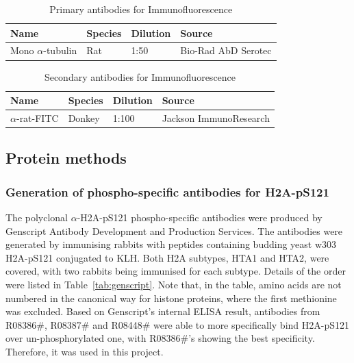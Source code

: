 \begin{table}[htbp]
\centering
\caption{Primary antibodies for Immunofluorescence}
\label{tab:1stabIF}
\begin{tabular}{llll}
\hline
\textbf{Name} & \textbf{Species} & \textbf{Dilution} & \textbf{Source} \\ \hline
Mono $\alpha$-tubulin & Rat & 1:50 & Bio-Rad AbD Serotec \\   
\end{tabular}
\end{table}

\begin{table}[htbp]
\centering
\caption{Secondary antibodies for Immunofluorescence}
\label{tab:2ndabIF}
\begin{tabular}{llll}
\hline
\textbf{Name} & \textbf{Species} & \textbf{Dilution} & \textbf{Source} \\ \hline
$\alpha$-rat-FITC & Donkey & 1:100 & Jackson ImmunoResearch \\   
\end{tabular}
\end{table}


\subsection{Protein methods}
\subsubsection{Generation of phospho-specific antibodies for H2A-pS121}

The polyclonal $\alpha$-H2A-pS121 phospho-specific antibodies were produced by Genscript Antibody Development and Production Services. The antibodies were generated by immunising rabbits with peptides containing budding yeast w303 H2A-pS121 conjugated to KLH. Both H2A subtypes, HTA1 and HTA2, were covered, with two rabbits being immunised for each subtype. Details of the order were listed in Table~\ref{tab:genscript}. Note that, in the table, amino acids are not numbered in the canonical way for histone proteins, where the first methionine was excluded. Based on Genscript's internal ELISA result, antibodies from R08386\#, R08387\# and R08448\# were able to more specifically bind H2A-pS121 over un-phosphorylated one, with R08386\#'s showing the best specificity. Therefore, it was used in this project. 

